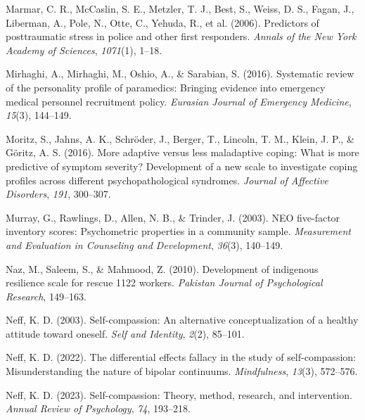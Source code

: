 \documentclass[
  man]{apa7}
\newlength{\cslhangindent}
\newlength{\cslentryspacingunit} %
\newenvironment{CSLReferences}[2] %
 {%
  \setlength{\parindent}{0pt}
  \ifodd #1
  \let\oldpar\par
  \def\par{\hangindent=\cslhangindent\oldpar}
  \fi
  \setlength{\parskip}{#2\cslentryspacingunit}
 }%
 {}
\begin{document}
\begin{CSLReferences}{1}{0}
\leavevmode{}%
Marmar, C. R., McCaslin, S. E., Metzler, T. J., Best, S., Weiss, D. S., Fagan, J., Liberman, A., Pole, N., Otte, C., Yehuda, R., et al. (2006). Predictors of posttraumatic stress in police and other first responders. \emph{Annals of the New York Academy of Sciences}, \emph{1071}(1), 1--18.

\leavevmode{}%
Mirhaghi, A., Mirhaghi, M., Oshio, A., \& Sarabian, S. (2016). Systematic review of the personality profile of paramedics: Bringing evidence into emergency medical personnel recruitment policy. \emph{Eurasian Journal of Emergency Medicine}, \emph{15}(3), 144--149.

\leavevmode{}%
Moritz, S., Jahns, A. K., Schröder, J., Berger, T., Lincoln, T. M., Klein, J. P., \& Göritz, A. S. (2016). More adaptive versus less maladaptive coping: What is more predictive of symptom severity? Development of a new scale to investigate coping profiles across different psychopathological syndromes. \emph{Journal of Affective Disorders}, \emph{191}, 300--307.

\leavevmode{}%
Murray, G., Rawlings, D., Allen, N. B., \& Trinder, J. (2003). NEO five-factor inventory scores: Psychometric properties in a community sample. \emph{Measurement and Evaluation in Counseling and Development}, \emph{36}(3), 140--149.

\leavevmode{}%
Naz, M., Saleem, S., \& Mahmood, Z. (2010). Development of indigenous resilience scale for rescue 1122 workers. \emph{Pakistan Journal of Psychological Research}, 149--163.

\leavevmode{}%
Neff, K. D. (2003). Self-compassion: An alternative conceptualization of a healthy attitude toward oneself. \emph{Self and Identity}, \emph{2}(2), 85--101.

\leavevmode{}%
Neff, K. D. (2022). The differential effects fallacy in the study of self-compassion: Misunderstanding the nature of bipolar continuums. \emph{Mindfulness}, \emph{13}(3), 572--576.

\leavevmode{}%
Neff, K. D. (2023). Self-compassion: Theory, method, research, and intervention. \emph{Annual Review of Psychology}, \emph{74}, 193--218.


\end{CSLReferences}
\end{document}
